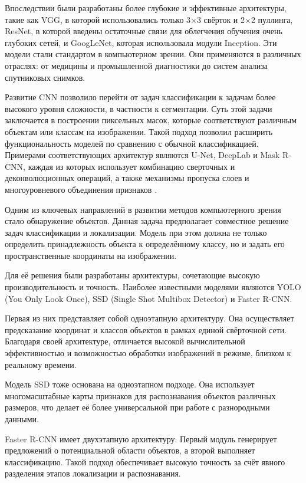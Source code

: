 Впоследствии были разработаны более глубокие и эффективные архитектуры, такие как VGG, в которой использовались только 3×3 свёрток и 2×2 пуллинга, ResNet, в которой введены остаточные связи для облегчения обучения очень глубоких сетей, и GoogLeNet, которая использовала модули Inception. Эти модели стали стандартом в компьютерном зрении. Они применяются в различных отраслях: от медицины и промышленной диагностики до систем анализа спутниковых снимков. 

Развитие CNN позволило перейти от задач классификации к задачам более высокого уровня сложности, в частности к сегментации. Суть этой задачи заключается в построении пиксельных масок, которые соответствуют различным объектам или классам на изображении. Такой подход позволил расширить функциональность моделей по сравнению с обычной классификацией. Примерами соответствующих архитектур являются U-Net, DeepLab и Mask R-CNN, каждая из которых использует комбинацию сверточных и деконволюционных операций, а также механизмы пропуска слоев и многоуровневого объединения признаков \cite{d22}  .

Одним из ключевых направлений в развитии методов компьютерного зрения стало обнаружение объектов. Данная задача предполагает совместное решение задач классификации и локализации. Модель при этом должна не только определить принадлежность объекта к определённому классу, но и задать его пространственные координаты на изображении.

Для её  решения были разработаны архитектуры, сочетающие высокую производительность и точность. Наиболее известными моделями являются YOLO (You Only Look Once), SSD (Single Shot Multibox Detector) и Faster R-CNN. 

Первая из них представляет собой одноэтапную архитектуру. Она осуществляет предсказание координат и классов объектов в рамках единой свёрточной сети. Благодаря своей архитектуре, отличается высокой вычислительной эффективностью и возможностью обработки изображений в режиме, близком к реальному времени. 

Модель SSD тоже основана на одноэтапном подходе. Она использует многомасштабные карты признаков для распознавания объектов различных размеров, что делает её более универсальной при работе с разнородными данными. 

Faster R-CNN имеет двухэтапную архитектуру. Первый модуль генерирует предложений о потенциальной области объектов, а второй выполняет классификацию. Такой подход обеспечивает высокую точность за счёт явного разделения этапов локализации и распознавания.

